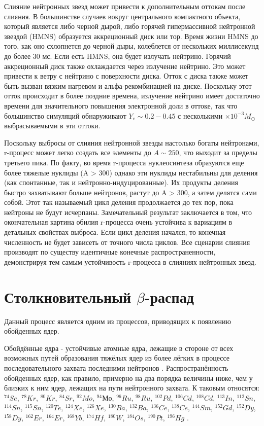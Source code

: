 \documentclass[%
master,    %
natbib,      %
subf,        %
href,        %
colorlinks,  %
]{disser}
\begin{document}
Слияние нейтронных звезд может привести к дополнительным оттокам после слияния. В большинстве случаев вокруг центрального компактного объекта, который является либо черной дырой, либо горячей гипермассивной нейтронной звездой (HMNS) образуется аккреционный диск или тор. Время жизни HMNS до того, как оно схлопнется до черной дыры, колеблется от нескольких миллисекунд до более 30 мс. Если есть HMNS, она будет излучать нейтрино. Горячий аккреционный диск также охлаждается через излучение нейтрино. Это может привести к ветру с нейтрино с поверхности диска. Отток с диска также может быть вызван вязким нагревом и альфа-рекомбинацией на диске. Поскольку этот отток происходит в более поздние времена, излучение нейтрино имеет достаточно времени для значительного повышения электронной доли в оттоке, так что большинство симуляций обнаруживают $Y_e \sim 0. 2 - 0.45$ с несколькими $\times 10^{-3} M_\odot$ выбрасываемыми в эти оттоки.

Поскольку выбросы от слияния нейтронной звезды настолько богаты нейтронами,  r-процесс может легко создать все элементы до $A \sim 250$, что выходит за пределы третьего пика. По факту, во время r-процесса нуклеосинтеза образуются еще более тяжелые нуклиды (A > 300) однако эти нуклиды нестабильны для деления (как спонтанные, так и нейтронно-индуцированные). Их продукты деления быстро захватывают больше нейтронов, растут до A > 300, а затем делятся сами собой. Этот так называемый цикл деления продолжается до тех пор, пока нейтроны не будут исчерпаны. Замечательный результат заключается в том, что окончательная картина обилия r-процесса очень устойчива к вариациям в детальных свойствах выброса. Если цикл деления начался, то конечная численность не будет зависеть от точного числа циклов. Все сценарии слияния производят по существу идентичные конечные распространенности, демонстрируя тем самым устойчивость r-процесса в слияниях нейтронных звезд.

\section{Столкновительный $\beta$-распад}
Данный процесс является одним из процессов, приводящих к появлению обойденных ядер.

Обойдённые ядра - устойчивые атомные ядра, лежащие в стороне от всех возможных путей образования тяжёлых ядер из более лёгких в процессе последовательного захвата последними нейтронов \cite{reactions}. Распространённость обойденных ядер, как правило, примерно на два порядка величины ниже, чем у близких к ним ядер, лежащих на пути нейтронного захвата. К таковым относятся: $^{74}Se$, $^{78}Kr$, $^{80}Kr$, $^{84}Sr$, $^{92}Mo$, $^{94}Мо$, $^{96}Ru$, $^{98}Ru$, $^{102}Pd$, $^{106}Cd$, $^{108}Cd$, $^{113}In$, $^{112}Sn$, $^{114}Sn$, $^{115}Sn$, $^{120}Te$, $^{124}Xe$, $^{126}Xe$, $^{130}Ba$, $^{132}Ba$, $^{136}Ce$, $^{138}Ce$, $^{144}Sm$, $^{152}Gd$, $^{152}Dy$, $^{158}Dy$, $^{162}Er$, $^{164}Er$, $^{168}Yb$, $^{174}Hf$, $^{180}W$, $^{184}Os$, $^{190}Pt$, $^{196}Hg$ \cite{role}.
\end{document}
